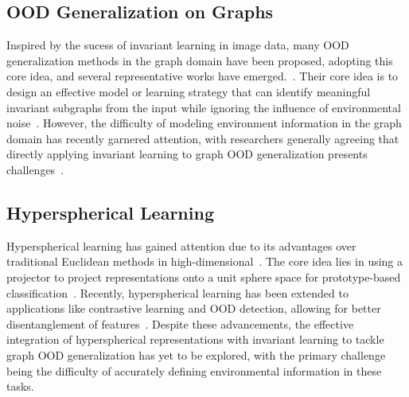 \subsection{OOD Generalization on Graphs}
Inspired by the sucess of invariant learning in image data, many OOD generalization methods in the graph domain have been proposed, adopting this core idea, and several representative works have emerged.~\citep{yang2022learning,li2022learning,liu2022graph,jia2024graph,fan2022debiasing,sui2022causal,miao2022interpretable}. 
Their core idea is to design an effective model or learning strategy that can identify meaningful invariant subgraphs from the input while ignoring the influence of environmental noise~\citep{wu2022discovering,chen2022learning}. However, the difficulty of modeling environment information in the graph domain has recently garnered attention, with researchers generally agreeing that directly applying invariant learning to graph OOD generalization presents challenges~\citep{chen2024does,zhuang2023learning}.

\subsection{Hyperspherical Learning} Hyperspherical learning has gained attention due to its advantages over traditional Euclidean methods in high-dimensional~\citep{davidson2018hyperspherical,ke2022hyperspherical}. The core idea lies in using a projector to project representations onto a unit sphere space for prototype-based classification~\citep{mettes2019hyperspherical}. Recently, hyperspherical learning has been extended to applications like contrastive learning and OOD detection,  allowing for better disentanglement of features~\citep{ming2022exploit,bai2024hypo}. Despite these advancements, the effective integration of hyperspherical representations with invariant learning to tackle graph OOD generalization has yet to be explored, with the primary challenge being the difficulty of accurately defining environmental information in these tasks.